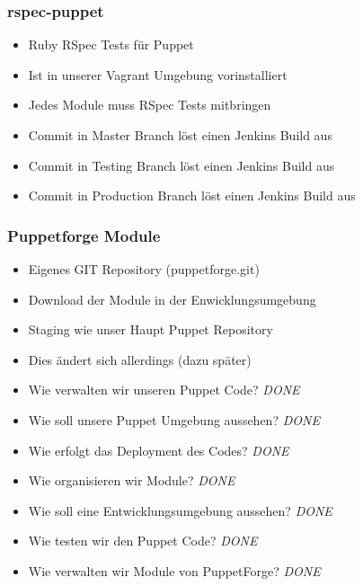 \documentclass{beamer}
\begin{document}
\begin{frame}
  \frametitle{rspec-puppet}

  \begin{itemize}
  \item Ruby RSpec Tests für Puppet
  \item Ist in unserer Vagrant Umgebung vorinstalliert
  \item Jedes Module muss RSpec Tests mitbringen
  \item Commit in Master Branch löst einen Jenkins Build aus
  \item Commit in Testing Branch löst einen Jenkins Build aus
  \item Commit in Production Branch löst einen Jenkins Build aus
  \end{itemize}
\end{frame}

\begin{frame}
\end{frame}

\begin{frame}
  \frametitle{Puppetforge Module}

  \begin{itemize}
  \item Eigenes GIT Repository (puppetforge.git)
  \item Download der Module in der Enwicklungsumgebung
  \item Staging wie unser Haupt Puppet Repository
  \item Dies ändert sich allerdings (dazu später)
  \end{itemize}
\end{frame}

\begin{frame}
  \begin{itemize}
  \item Wie verwalten wir unseren Puppet Code? \emph{\color{green}DONE}
  \item Wie soll unsere Puppet Umgebung aussehen?  \emph{\color{green}DONE}
  \item Wie erfolgt das Deployment des Codes? \emph{\color{green}DONE}
  \item Wie organisieren wir Module? \emph{\color{green}DONE}
  \item Wie soll eine Entwicklungsumgebung aussehen? \emph{\color{green}DONE}
  \item Wie testen wir den Puppet Code? \emph{\color{green}DONE}
  \item Wie verwalten wir Module von PuppetForge? \emph{\color{green}DONE}
  \end{itemize}
\end{frame}
\end{document}
